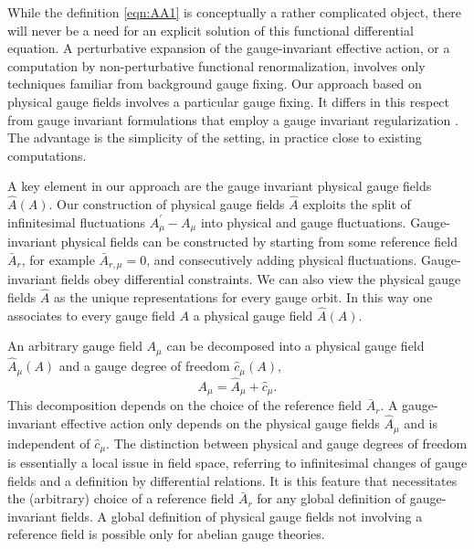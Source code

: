 \documentclass[twocolumn,aps,prd,amsmath,amssymb,preprintnumbers,longbibliography]{revtex4-1}
\numberwithin{equation}{section}
\begin{document}
While the definition \eqref{eqn:AA1} is conceptually a rather complicated object, there will never be a need for an explicit solution of this functional differential equation. A perturbative expansion of the gauge-invariant effective action, or a computation by non-perturbative functional renormalization, involves only techniques familiar from background gauge fixing. Our approach based on physical gauge fields involves a particular gauge fixing. It differs in this respect from gauge invariant formulations that employ a gauge invariant regularization \cite{MOR1,MOR2,MOR3}. The advantage is the simplicity of the setting, in practice close to existing computations.

A key element in our approach are the gauge invariant physical gauge fields $\hat{A}(A)$. Our construction of physical gauge fields $\hat{A}$ exploits the split of infinitesimal fluctuations $A_\mu^\prime - A_\mu$ into physical and gauge fluctuations. Gauge-invariant physical fields can be constructed by starting from some reference field $\bar{A}_r$, for example $\bar{A}_{r,\mu} = 0$, and consecutively adding physical fluctuations. Gauge-invariant fields obey differential constraints. We can also view the physical gauge fields $\hat{A}$ as the unique representations for every gauge orbit. In this way one associates to every gauge field $A$ a physical gauge field $\hat{A}(A)$. 

An arbitrary gauge field $A_\mu$ can be decomposed into a physical gauge field $\hat{A}_\mu(A)$ and a gauge degree of freedom $\hat{c}_\mu(A)$,
\begin{equation}
	A_\mu
	= \hat{A}_\mu + \hat{c}_\mu.
\end{equation}
This decomposition depends on the choice of the reference field $\bar{A}_r$. A gauge-invariant effective action only depends on the physical gauge fields $\hat{A}_\mu$ and is independent of $\hat{c}_\mu$. The distinction between physical and gauge degrees of freedom is essentially a local issue in field space, referring to infinitesimal changes of gauge fields and a definition by differential relations. It is this feature that necessitates the (arbitrary) choice of a reference field $\bar{A}_r$ for any global definition of gauge-invariant fields. A global definition of physical gauge fields not involving a reference field is possible only for abelian gauge theories.
\end{document}
